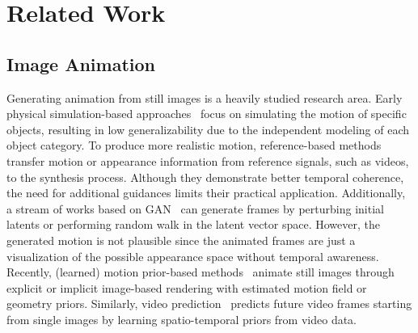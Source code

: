 \vspace{-1mm}
\section{Related Work}
\label{sec:relatedwork}
\vspace{-1mm}
\subsection{Image Animation}
\label{subsec:image_animation}
Generating animation from still images is a heavily studied research area. Early physical simulation-based approaches~\cite{jhou2015animating,chuang2005animating} focus on simulating the motion of specific objects, %
resulting in low generalizability due to the independent modeling of each object category. To produce more realistic motion, reference-based methods~\cite{prashnani2017phase,okabe2009animating,siarohin2019first,cheng2020time,karras2023dreampose,siarohin2019animating,siarohin2021motion,wang2021latent} transfer motion or appearance information from reference signals, such as videos, to the synthesis process. Although they demonstrate better temporal coherence, the need for additional guidances limits their practical application. Additionally, a stream of works based on GAN~\cite{shaham2019singan,hinz2021improved,karras2020analyzing} can generate frames by perturbing initial latents or performing random walk in the latent vector space. However, the generated motion is not plausible since the animated frames are just a visualization of the possible appearance space without temporal awareness. Recently, (learned) motion prior-based methods~\cite{endo2019animating,holynski2021animating,mallya2022implicit,ni2023conditional,weng2019photo,zhao2022thin,xiao2023automatic,hu2022make} animate still images through explicit or implicit image-based rendering with estimated motion field or geometry priors. Similarly, video prediction~\cite{zhang2020dtvnet,xiong2018learning,babaeizadeh2018stochastic,li2018flow,xue2016visual,voleti2022mcvd,hu2023dynamic,hoppe2022diffusion,franceschi2020stochastic} predicts future video frames starting from single images by learning spatio-temporal priors from video data.


